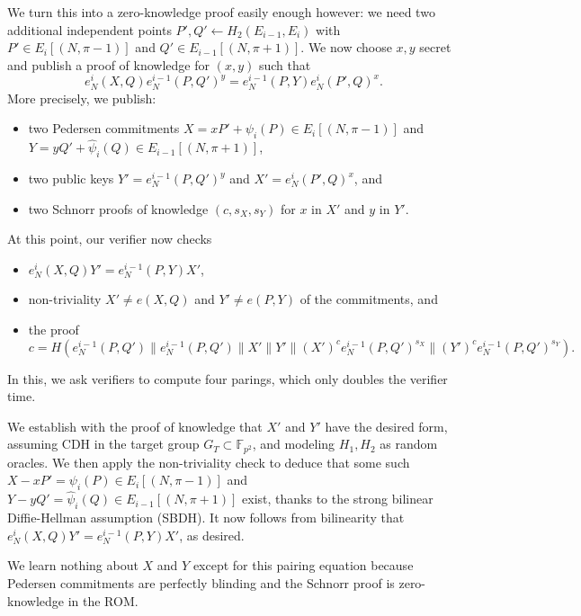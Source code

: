 \documentclass{llncs}
\newcommand{\F}{\mathbb{F}}
\begin{document}
We turn this into a zero-knowledge proof easily enough however: 
we need two additional independent points
$P',Q' \gets H_2(E_{i-1},E_i)$ with
 $P' \in E_i[(N,\pi-1)]$ and $Q' \in E_{i-1}[(N,\pi+1)]$.
We now choose $x,y$ secret and publish a proof of knowledge for $(x,y)$ such that
$$ e_N^i(X,Q) e_N^{i-1}(P,Q')^y  = e_N^{i-1}(P,Y) e_N^i(P',Q)^x . $$
More precisely, we publish:
\begin{itemize}
\item two Pedersen commitments 
 $X = x P' + \psi_i(P) \in E_i[(N,\pi-1)]$ and
 $Y = y Q' + \hat\psi_i(Q) \in E_{i-1}[(N,\pi+1)]$,
\item two public keys $Y' = e_N^{i-1}(P,Q')^y$ and $X' = e_N^i(P',Q)^x$, and
\item two Schnorr proofs of knowledge $(c,s_X,s_Y)$ for $x$ in $X'$ and $y$ in $Y'$.
\end{itemize}
At this point, our verifier now checks 
\begin{itemize}
\item $e_N^i(X,Q) Y' = e_N^{i-1}(P,Y) X'$,
\item non-triviality $X' \ne e(X,Q)$ and $Y' \ne e(P,Y)$ of the commitments, and
\item the proof
  $$c = H( e_N^{i-1}(P,Q') \| e_N^{i-1}(P,Q') \| X' \| Y' \| (X')^c e_N^{i-1}(P,Q')^{s_X} \| (Y')^c e_N^{i-1}(P,Q')^{s_Y} ).$$
\end{itemize}
In this, we ask verifiers to compute four parings, which only doubles
the verifier time.

We establish with the proof of knowledge that $X'$ and $Y'$ have
the desired form, assuming CDH in the target group $G_T\subset\F_{p^2}$,
and modeling $H_1,H_2$ as random oracles.
We then apply the non-triviality check to deduce that some such 
 $X - x P' = \psi_i(P) \in E_i[(N,\pi-1)]$ and
 $Y - y Q' = \hat\psi_i(Q) \in E_{i-1}[(N,\pi+1)]$
exist, thanks to the strong bilinear Diffie-Hellman assumption (SBDH).
It now follows from bilinearity that $e_N^i(X,Q)Y' = e_N^{i-1}(P,Y)X'$, as desired.

We learn nothing about $X$ and $Y$ except for this pairing equation 
because Pedersen commitments are perfectly blinding and
the Schnorr proof is zero-knowledge in the ROM.
\end{document}
